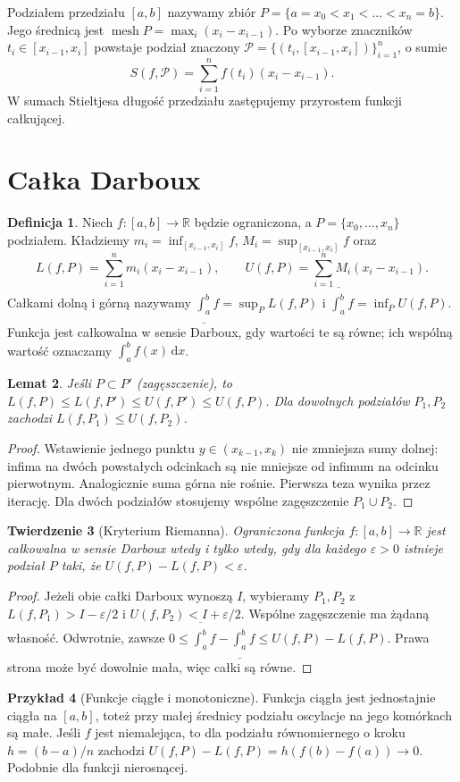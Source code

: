 \documentclass[11pt,a4paper]{article}
\numberwithin{equation}{section}
\theoremstyle{plain}
\newtheorem{twierdzenie}{Twierdzenie}[section]
\newtheorem{lemat}[twierdzenie]{Lemat}
\theoremstyle{definition}
\newtheorem{definicja}[twierdzenie]{Definicja}
\newtheorem{przyklad}[twierdzenie]{Przykład}
\theoremstyle{remark}
\newcommand{\R}{\mathbb R}
\newcommand{\mesh}{\operatorname{mesh}}
\begin{document}
Podziałem przedziału $[a,b]$ nazywamy zbiór $P=\{a=x_0<x_1<\dots<x_n=b\}$. Jego średnicą jest $\mesh P=\max_i(x_i-x_{i-1})$. Po wyborze znaczników $t_i\in[x_{i-1},x_i]$ powstaje podział znaczony $\mathcal P=\{(t_i,[x_{i-1},x_i])\}_{i=1}^n$, o sumie
\[
S(f,\mathcal P)=\sum_{i=1}^n f(t_i)(x_i-x_{i-1}).
\]
W sumach Stieltjesa długość przedziału zastępujemy przyrostem funkcji całkującej.

\section{Całka Darboux}
\begin{definicja}
Niech $f:[a,b]\to\R$ będzie ograniczona, a $P=\{x_0,\dots,x_n\}$ podziałem. Kładziemy $m_i=\inf_{[x_{i-1},x_i]}f$, $M_i=\sup_{[x_{i-1},x_i]}f$ oraz
\[
L(f,P)=\sum_{i=1}^n m_i(x_i-x_{i-1}),\qquad
U(f,P)=\sum_{i=1}^n M_i(x_i-x_{i-1}).
\]
Całkami dolną i górną nazywamy $\underline{\int_a^b}f=\sup_P L(f,P)$ i $\overline{\int_a^b}f=\inf_P U(f,P)$. Funkcja jest całkowalna w sensie Darboux, gdy wartości te są równe; ich wspólną wartość oznaczamy $\int_a^b f(x)\,\mathrm dx$.
\end{definicja}
\begin{lemat}
Jeśli $P\subset P'$ (zagęszczenie), to $L(f,P)\le L(f,P')\le U(f,P')\le U(f,P)$. Dla dowolnych podziałów $P_1,P_2$ zachodzi $L(f,P_1)\le U(f,P_2)$.
\end{lemat}
\begin{proof}
Wstawienie jednego punktu $y\in(x_{k-1},x_k)$ nie zmniejsza sumy dolnej: infima na dwóch powstałych odcinkach są nie mniejsze od infimum na odcinku pierwotnym. Analogicznie suma górna nie rośnie. Pierwsza teza wynika przez iterację. Dla dwóch podziałów stosujemy wspólne zagęszczenie $P_1\cup P_2$.
\end{proof}
\begin{twierdzenie}[Kryterium Riemanna]
Ograniczona funkcja $f:[a,b]\to\R$ jest całkowalna w sensie Darboux wtedy i tylko wtedy, gdy dla każdego $\varepsilon>0$ istnieje podział $P$ taki, że $U(f,P)-L(f,P)<\varepsilon$.
\end{twierdzenie}
\begin{proof}
Jeżeli obie całki Darboux wynoszą $I$, wybieramy $P_1,P_2$ z $L(f,P_1)>I-\varepsilon/2$ i $U(f,P_2)<I+\varepsilon/2$. Wspólne zagęszczenie ma żądaną własność. Odwrotnie, zawsze $0\le\overline{\int_a^b}f-\underline{\int_a^b}f\le U(f,P)-L(f,P)$. Prawa strona może być dowolnie mała, więc całki są równe.
\end{proof}
\begin{przyklad}[Funkcje ciągłe i monotoniczne]
Funkcja ciągła jest jednostajnie ciągła na $[a,b]$, toteż przy małej średnicy podziału oscylacje na jego komórkach są małe. Jeśli $f$ jest niemalejąca, to dla podziału równomiernego o kroku $h=(b-a)/n$ zachodzi $U(f,P)-L(f,P)=h(f(b)-f(a))\to0$. Podobnie dla funkcji nierosnącej.
\end{przyklad}
\end{document}
